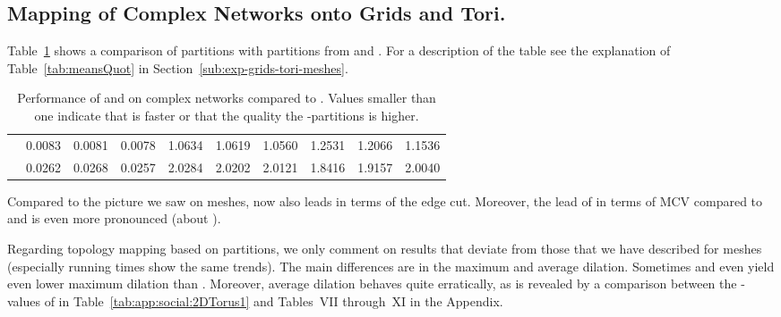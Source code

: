 \documentclass[pdftex]{llncs}
\begin{document}
\subsection{Mapping of Complex Networks onto Grids and Tori.}
\label{sub:exp-complex-grids-tori}

Table~\ref{tab:meansQuotComplex} shows a comparison of
 partitions with partitions from  and
. For a description of the table see the explanation of
Table~\ref{tab:meansQuot} in Section~\ref{sub:exp-grids-tori-meshes}.

\begin{table}[htb]
  \caption{Performance of  and  on complex
    networks compared to . Values smaller than one indicate
    that  is faster or that the quality the
    -partitions is higher.}
\begin{center}
\begin{tabular}{ l | c c c | c c c | c c c}
           &  &  &
     &  &  &
     &  &  &
     \\\hline \hline
     & 0.0083 & 0.0081 & 0.0078 & 1.0634 & 1.0619 & 1.0560 & 1.2531 & 1.2066 & 1.1536\\
     & 0.0262 & 0.0268 & 0.0257 & 2.0284 & 2.0202 & 2.0121 & 1.8416 & 1.9157 & 2.0040
\end{tabular}
\end{center}
\label{tab:meansQuotComplex}
\end{table}

Compared to the picture we saw on meshes,  now also leads in
terms of the edge cut. Moreover, the lead of  in terms of MCV
compared to  and  is even more pronounced (about
).

Regarding topology mapping based on  partitions, we only
comment on results that deviate from those that we have described for
meshes (especially running times show the same trends). The main
differences are in the maximum and average dilation. Sometimes 
and even  yield even lower maximum dilation than
. Moreover, average dilation behaves quite erratically,
as is revealed by a comparison between the -values of
 in Table~\ref{tab:app:social:2DTorus1} and
Tables~VII through~XI in the Appendix.
\end{document}
